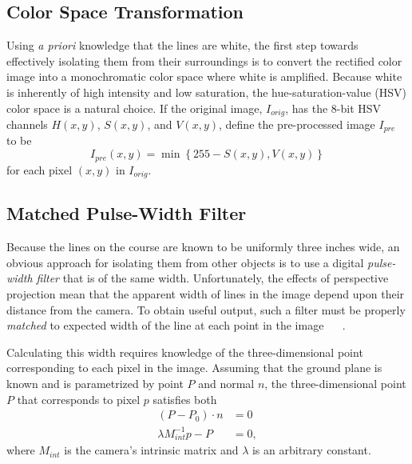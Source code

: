 \documentclass[twocolumn,11pt]{article}
\begin{document}
\subsection{Color Space Transformation}
\label{sec:line-color}
Using \textit{a priori} knowledge that the lines are white, the first step
towards effectively isolating them from their surroundings is to convert the
rectified color image into a monochromatic color space where white is
amplified. Because white is inherently of high intensity and low saturation,
the hue-saturation-value (HSV) color space is a natural choice. If the original
image, $I_{orig}$, has the 8-bit HSV channels $H(x,y)$, $S(x, y)$, and $V(x,
y)$, define the pre-processed image $I_{pre}$ to be
\begin{equation*}
	I_{pre}(x, y) = \min\left\{255 - S(x, y), V(x, y)\right\}
\end{equation*}
for each pixel $(x, y)$ in $I_{orig}$.

\subsection{Matched Pulse-Width Filter}
\label{sec:line-filter}
Because the lines on the course are known to be uniformly three inches wide, an
obvious approach for isolating them from other objects is to use a digital
\textit{pulse-width filter} that is of the same width. Unfortunately, the
effects of perspective projection mean that the apparent width of lines in the
image depend upon their distance from the camera. To obtain useful output, such
a filter must be properly \textit{matched} to expected width of the line at
each point in the image ~\cite{huang_thesis} ~\cite{huang_paper}.

Calculating this width requires knowledge of the three-dimensional point
corresponding to each pixel in the image. Assuming that the ground plane is
known and is parametrized by point $P$ and normal $n$, the three-dimensional
point $P$ that corresponds to pixel $p$ satisfies both
\begin{align*}
	(P - P_0) \cdot n          &= 0 \\
	\lambda M^{-1}_{int} p - P &= 0,
\end{align*}
where $M_{int}$ is the camera's intrinsic matrix and $\lambda$ is an arbitrary
constant.
\end{document}
